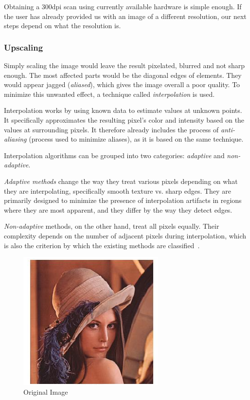Obtaining a 300dpi scan using currently available hardware is simple enough. If the user has already provided us with an image of a different resolution, our next steps depend on what the resolution is.

\subsubsection{Upscaling}

Simply scaling the image would leave the result pixelated, blurred and not sharp enough. The most affected parts would be the diagonal edges of elements. They would appear jagged (\emph{aliased}), which gives the image overall a poor quality. To minimize this unwanted effect, a technique called \emph{interpolation} is used.

Interpolation works by using known data to estimate values at unknown points. It specifically approximates the resulting pixel's color and intensity based on the values at surrounding pixels. It therefore already includes the process of \emph{anti-aliasing} (process used to minimize aliases), as it is based on the same technique.

Interpolation algorithms can be grouped into two categories: \emph{adaptive} and \emph{non-adaptive}.

\emph{Adaptive methods} change the way they treat various pixels depending on what they are interpolating, specifically smooth texture vs. sharp edges. They are primarily designed to minimize the presence of interpolation artifacts in regions where they are most apparent, and they differ by the way they detect edges.

\emph{Non-adaptive} methods, on the other hand, treat all pixels equally. Their complexity depends on the number of adjacent pixels during interpolation, which is also the criterion by which the existing methods are classified~\cite{interpolation}.

\begin{figure}[H]
\centering
\includegraphics[width=0.3\linewidth]{img/interp_orig.pdf}
\caption{Original Image} \label{fig:1a}
\end{figure}

